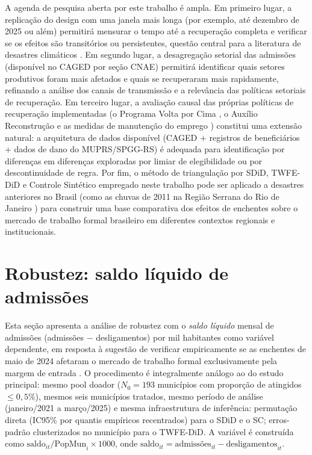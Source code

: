 \documentclass[a4paper,12pt]{article}
\begin{document}
A agenda de pesquisa aberta por este trabalho é ampla. Em primeiro lugar, a replicação do
design com uma janela mais longa (por exemplo, até dezembro de 2025 ou além) permitirá
mensurar o tempo até a recuperação completa e verificar se os efeitos são transitórios ou
persistentes, questão central para a literatura de desastres climáticos
\cite{kahn2005death, berlemann2018}. Em segundo lugar, a desagregação setorial das
admissões (disponível no CAGED por seção CNAE) permitirá identificar quais setores
produtivos foram mais afetados e quais se recuperaram mais rapidamente, refinando a
análise dos canais de transmissão e a relevância das políticas setoriais de recuperação.
Em terceiro lugar, a avaliação causal das próprias políticas de recuperação implementadas
(o Programa Volta por Cima \cite{riograndedosul2024decreto57779}, o Auxílio
Reconstrução e as medidas de manutenção do emprego \cite{brasil2024mp1230}) constitui
uma extensão natural: a arquitetura de dados disponível (CAGED $+$ registros de
beneficiários $+$ dados de dano do MUPRS/SPGG-RS) é adequada para identificação por
diferenças em diferenças exploradas por limiar de elegibilidade ou por descontinuidade de
regra. Por fim, o método de triangulação por SDiD, TWFE-DiD e Controle Sintético
empregado neste trabalho pode ser aplicado a desastres anteriores no Brasil
(como as chuvas de 2011 na Região Serrana do Rio de Janeiro \cite{haddad2015economic}) para
construir uma base comparativa dos efeitos de enchentes sobre o mercado de trabalho
formal brasileiro em diferentes contextos regionais e institucionais.


\clearpage
\appendix
\renewcommand{\thesection}{Apêndice~\Alph{section}}

\section{Robustez: saldo líquido de admissões}
\label{apx:saldo}

Esta seção apresenta a análise de robustez com o \emph{saldo líquido} mensal de admissões
(admissões $-$ desligamentos) por mil habitantes como variável dependente, em resposta à
sugestão de verificar empiricamente se as enchentes de maio de 2024 afetaram o mercado de
trabalho formal exclusivamente pela margem de entrada \cite{teixeira2024}. O
procedimento é integralmente análogo ao do estudo principal: mesmo pool doador
($N_0 = 193$ municípios com proporção de atingidos $\leq 0{,}5\%$), mesmos seis
municípios tratados, mesmo período de análise (janeiro/2021 a março/2025) e
mesma infraestrutura de inferência: permutação direta (IC95\% por quantis empíricos
recentrados) para o SDiD e o SC; erros-padrão clusterizados no município para o
TWFE-DiD. A variável é construída como $\text{saldo}_{it}/\text{PopMun}_i \times 1000$,
onde $\text{saldo}_{it} = \text{admissões}_{it} - \text{desligamentos}_{it}$.
\end{document}

